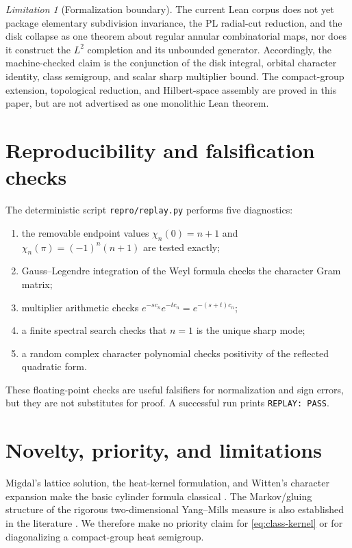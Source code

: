 \documentclass[11pt]{article}
\theoremstyle{remark}
\newtheorem{limitation}[theorem]{Limitation}
\begin{document}
\begin{limitation}[Formalization boundary]
The current Lean corpus does not yet package elementary subdivision invariance,
the PL radial-cut reduction, and the disk collapse as one theorem about regular
annular combinatorial maps, nor does it
construct the $L^2$ completion and its unbounded generator.  Accordingly, the
machine-checked claim is the conjunction of the disk integral, orbital
character identity, class semigroup, and scalar sharp multiplier bound.  The
compact-group extension, topological reduction, and Hilbert-space assembly are
proved in this paper, but are not advertised as one monolithic Lean theorem.
\end{limitation}

\section{Reproducibility and falsification checks}

The deterministic script \texttt{repro/replay.py} performs five diagnostics:
\begin{enumerate}
\item the removable endpoint values
$\chi_n(0)=n+1$ and $\chi_n(\pi)=(-1)^n(n+1)$ are tested exactly;
\item Gauss--Legendre integration of the Weyl formula checks the character
Gram matrix;
\item multiplier arithmetic checks $e^{-sc_n}e^{-tc_n}=e^{-(s+t)c_n}$;
\item a finite spectral search checks that $n=1$ is the unique sharp mode;
\item a random complex character polynomial checks positivity of the reflected
quadratic form.
\end{enumerate}
These floating-point checks are useful falsifiers for normalization and sign
errors, but they are not substitutes for proof.  A successful run prints
\texttt{REPLAY: PASS}.

\section{Novelty, priority, and limitations}

Migdal's lattice solution, the heat-kernel formulation, and Witten's character
expansion make the basic cylinder formula classical
\cite{Migdal1975,Witten1991,Levy2003}.  The Markov/gluing structure of the
rigorous two-dimensional Yang--Mills measure is also established in the
literature \cite{Levy2003,DriverGabrielHallKemp2017}.  We therefore make no
priority claim for \eqref{eq:class-kernel} or for diagonalizing a compact-group
heat semigroup.
\end{document}
